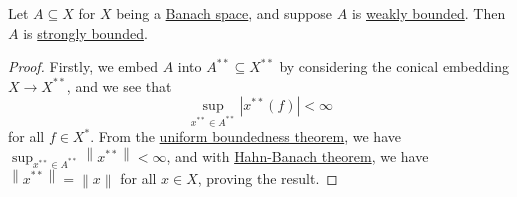 \begin{corollary}\label{col:weak-bd-implies-strong-bd}
	Let \(A \subseteq X\) for \(X\) being a \hyperref[def:Banach-space]{Banach space}, and suppose \(A\) is \hyperref[def:weakly-bounded]{weakly bounded}. Then \(A\) is \hyperref[def:strongly-bounded]{strongly bounded}.
\end{corollary}
\begin{proof}
	Firstly, we embed \(A\) into \(A^{\ast\ast} \subseteq X^{\ast\ast} \) by considering the conical embedding \(X\to X^{\ast\ast}\), and we see that
	\[
		\sup _{x^{\ast\ast}\in A^{\ast\ast}} \left\vert x^{\ast\ast} (f) \right\vert < \infty
	\]
	for all \(f\in X^{\ast} \). From the \hyperref[thm:uniform-boundedness]{uniform boundedness theorem}, we have \(\sup _{x^{\ast\ast} \in A^{\ast\ast} }\left\lVert x^{\ast\ast} \right\rVert < \infty \), and with \hyperref[thm:Hahn-Banach]{Hahn-Banach theorem}, we have \(\left\lVert x^{\ast\ast} \right\rVert = \left\lVert x\right\rVert \) for all \(x\in X\), proving the result.
\end{proof}